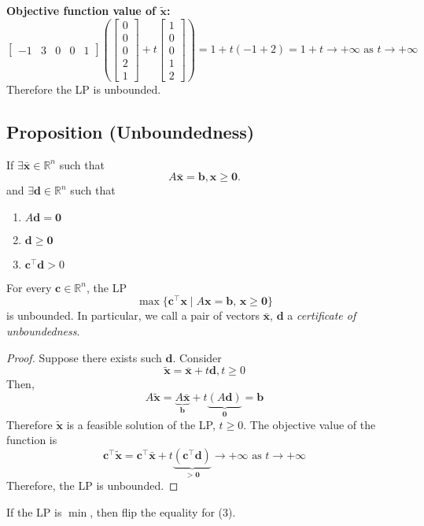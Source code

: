 \textbf{Objective function value of $\tilde{\mathbf{x}}$:}
\[
\begin{bmatrix}
    -1 & 3 & 0 & 0 & 1
\end{bmatrix}
\left(\begin{bmatrix}
    0\\
    0\\
    0\\
    2\\
    1  
\end{bmatrix}
+
t
\begin{bmatrix}
    1\\
    0\\
    0\\
    1\\
    2
\end{bmatrix}\right)
=
1+t(-1+2)=1+t\rightarrow+\infty \text{ as }t\rightarrow+\infty\]
Therefore the LP is unbounded.


\begin{thmbox}
    \subsection{Proposition (Unboundedness)}
    If $\exists \mathbf{\bar{x}}\in\mathbb{R}^n$ such that
    \[A\mathbf{\bar{x}}=\mathbf{b}, \mathbf{x}\ge \mathbf{0}.\]
    and $\exists\mathbf{d}\in\mathbb{R}^n$ such that
    \begin{enumerate}[(1)]
        \item $A\mathbf{d}=\mathbf{0}$
        \item $\mathbf{d}\ge \mathbf{0}$
        \item $\mathbf{c}^\top \mathbf{d}>0$
    \end{enumerate}
    For every $\mathbf{c}\in\mathbb{R}^n$, the LP
    \[\max \{\mathbf{c}^\top \mathbf{x} \mid A\mathbf{x}=\mathbf{b}\text{, }
    \mathbf{x}\ge\mathbf{0}\}\]
    is unbounded. In particular, we call a pair of vectors $\mathbf{\bar{x}}$, $\mathbf{d}$ a
    \emph{certificate of unboundedness}.
\end{thmbox}

\begin{proof}
    Suppose there exists such $\mathbf{d}$. Consider
    \[\tilde{\mathbf{x}}=\bar{\mathbf{x}}+t\mathbf{d}, t\ge 0\]
Then,
\[A\tilde{\mathbf{x}}=
\underbrace{A\bar{\mathbf{x}}}_{\mathbf{b}}+
t\underbrace{(A\mathbf{d})}_{\mathbf{0}}=\mathbf{b}\]
Therefore $\tilde{\mathbf{x}}$ is a feasible solution of the LP, $t\ge 0$.
The objective value of the function is
\[\mathbf{c}^\top \tilde{\mathbf{x}}=\mathbf{c}^\top \bar{\mathbf{x}}+t
\underbrace{(\mathbf{c}^\top \mathbf{d})}_{>\mathbf{0}}\rightarrow +\infty\text{ as }t\rightarrow+\infty\]
Therefore, the LP is unbounded.
\end{proof}
\begin{remark}
    If the LP is $\min$, then flip the equality for (3).
\end{remark}

